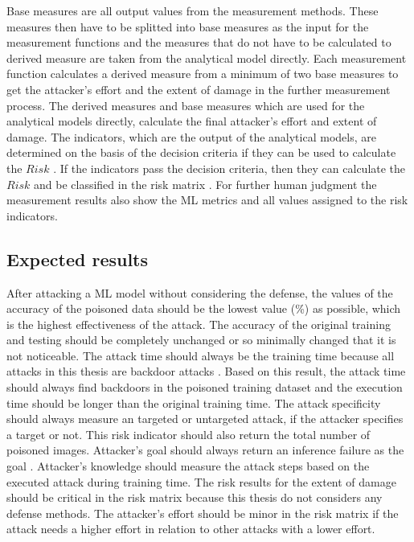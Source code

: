 Base measures are all output values from the measurement methods. These measures then have to be splitted into base measures as the input for the measurement functions and the measures that do not have to be calculated to derived measure are taken from the analytical model directly. Each measurement function calculates a derived measure from a minimum of two base measures to get the attacker's effort and the extent of damage in the further measurement process. The derived measures and base measures which are used for the analytical models directly, calculate the final attacker's effort and extent of damage. The indicators, which are the output of the analytical models, are determined on the basis of the decision criteria if they can be used to calculate the $Risk$ \cite{DBLP:journals/access/JianxingHSH21}. If the indicators pass the decision criteria, then they can calculate the $Risk$ and be classified in the risk matrix \cite{Ivanenko2020IMPLEMENTATIONOR}. For further human judgment the measurement results also show the ML metrics and all values assigned to the risk indicators.

\subsection{Expected results}

After attacking a ML model without considering the defense, the values of the accuracy of the poisoned data should be the lowest value (\%) as possible, which is the highest effectiveness of the attack. The accuracy of the original training and testing should be completely unchanged or so minimally changed that it is not noticeable. The attack time should always be the training time because all attacks in this thesis are backdoor attacks \cite{DBLP:journals/tr/UdeshiPWLRC22}. Based on this result, the attack time should always find backdoors in the poisoned training dataset and the execution time should be longer than the original training time. The attack specificity should always measure an targeted or untargeted attack, if the attacker specifies a target or not. This risk indicator should also return the total number of poisoned images. Attacker's goal should always return an inference failure as the goal \cite{DBLP:journals/corr/abs-2012-04884}. Attacker's knowledge should measure the attack steps based on the executed attack during training time. The risk results for the extent of damage should be critical in the risk matrix because this thesis do not considers any defense methods. The attacker's effort should be minor in the risk matrix if the attack needs a higher effort in relation to other attacks with a lower effort.
